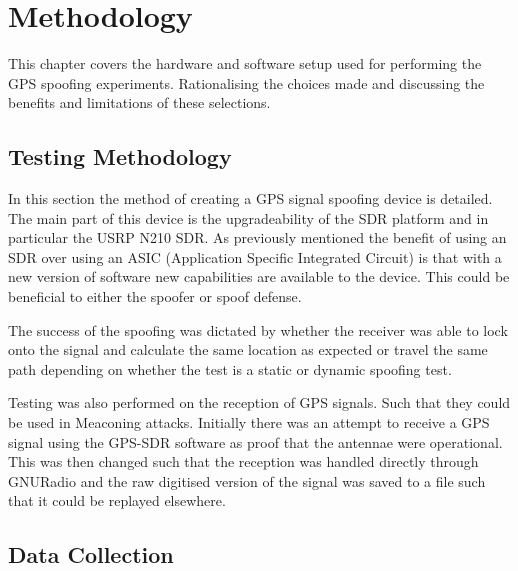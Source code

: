 \chapter{Methodology} %

\label{Chapter4} %

This chapter covers the hardware and software setup used for performing the GPS spoofing experiments. Rationalising the choices made and discussing the benefits and
limitations of these selections.


\section{Testing Methodology}

In this section the method of creating a GPS signal spoofing device is detailed. The main part of this device is the upgradeability of the SDR platform
and in particular the USRP N210 SDR. As previously mentioned the benefit of using an SDR over using an ASIC (Application Specific Integrated Circuit) is that with a new version of software 
new capabilities are available to the device. This could be beneficial to either the spoofer or spoof defense. 

The success of the spoofing was dictated by whether the receiver was able to lock onto the signal and calculate the same location as expected or travel the same path
depending on whether the test is a static or dynamic spoofing test. 

Testing was also performed on the reception of GPS signals. Such that they could be used in Meaconing attacks. Initially there was an attempt to receive a GPS signal using
the GPS-SDR software as proof that the antennae were operational. This was then changed such that the reception was handled directly through GNURadio and the raw
digitised version of the signal was saved to a file such that it could be replayed elsewhere.


\section{Data Collection}

